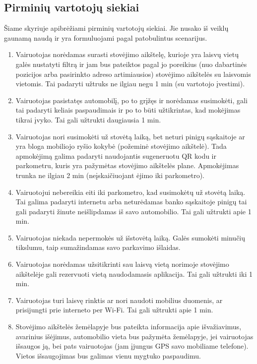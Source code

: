 \documentclass{VUMIFPSkursinis}
\begin{document}
\subsection{Pirminių vartotojų siekiai}
Šiame skyriuje apibrėžiami pirminių vartotojų siekiai. Jie nusako iš veiklų gaunamą naudą  ir yra formuluojami pagal patobulintus scenarijus.
\begin{enumerate}[label = \textbf{PVS\arabic*.}]
	\item Vairuotojas norėdamas surasti stovėjimo aikštelę, kurioje yra laisvų vietų galės nustatyti filtrą ir jam bus pateiktos pagal jo poreikius (nuo dabartinės pozicijos arba pasirinkto adreso artimiausios) stovėjimo aikštelės su laisvomis vietomis. Tai padaryti užtruks ne ilgiau negu 1 min (su vartotojo įvestimi).
	\item Vairuotojas pasistatęs automobilį, po to grįžęs ir norėdamas susimokėti, gali tai padaryti keliais paspaudimais ir po to būti užtikrintas, kad mokėjimas tikrai įvyko. Tai gali užtrukti daugiausia 1 min.
	\item Vairuotojas nori susimokėti už stovėtą laiką, bet neturi pinigų sąskaitoje ar yra bloga mobiliojo ryšio kokybė (požeminė stovėjimo aikštelė). Tada apmokėjimą galima padaryti naudojantis sugeneruotu QR kodu ir parkometru, kuris yra pažymėtas stovėjimo aikštelės plane. Apmokėjimas trunka ne ilgiau 2 min (neįskaičiuojant ėjimo iki parkometro).
	\item Vairuotojui nebereikia eiti iki parkometro, kad susimokėtų už stovėtą laiką. Tai galima padaryti internetu arba neturėdamas banko sąskaitoje pinigų tai gali padaryti žinute neišlipdamas iš savo automobilio. Tai gali užtrukti apie 1 min.
	\item Vairuotojas niekada nepermokės už išstovėtą laiką. Galės sumokėti minučių tikslumu, taip sumažindamas savo parkavimo išlaidas. 
	\item Vairuotojas norėdamas užsitikrinti sau laisvą vietą norimoje stovėjimo aikštelėje gali rezervuoti vietą naudodamasis aplikacija. Tai gali užtrukti iki 1 min.
	\item Vairuotojas turi laisvę rinktis ar nori naudoti mobilius duomenis, ar prisijungti prie interneto per Wi-Fi. Tai gali užtrukti apie 1 min.
	\item Stovėjimo aikštelės žemėlapyje bus pateikta informacija apie išvažiavimus, avarinius išėjimus, automobilio vieta bus pažymėta žemėlapyje, jei vairuotojas išsaugos ją, bei pats vairuotojas (jam įjungus GPS savo mobiliame telefone). Vietos išsaugojimas bus galimas vienu mygtuko paspaudimu.

\end{enumerate}
\end{document}
